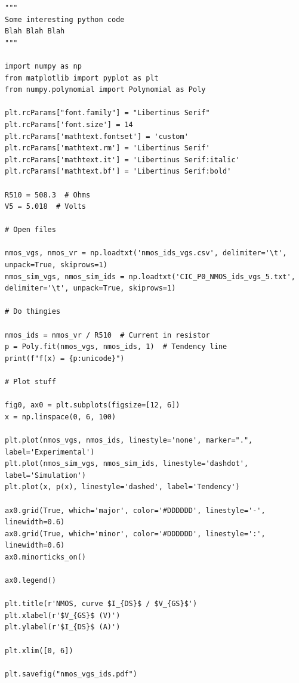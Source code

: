\begin{code}
\label{code:apx:a:python}
\begin{verbatim}
"""
Some interesting python code 
Blah Blah Blah
"""

import numpy as np
from matplotlib import pyplot as plt
from numpy.polynomial import Polynomial as Poly

plt.rcParams["font.family"] = "Libertinus Serif"
plt.rcParams['font.size'] = 14
plt.rcParams['mathtext.fontset'] = 'custom'
plt.rcParams['mathtext.rm'] = 'Libertinus Serif'
plt.rcParams['mathtext.it'] = 'Libertinus Serif:italic'
plt.rcParams['mathtext.bf'] = 'Libertinus Serif:bold'

R510 = 508.3  # Ohms
V5 = 5.018  # Volts

# Open files

nmos_vgs, nmos_vr = np.loadtxt('nmos_ids_vgs.csv', delimiter='\t', unpack=True, skiprows=1)
nmos_sim_vgs, nmos_sim_ids = np.loadtxt('CIC_P0_NMOS_ids_vgs_5.txt', delimiter='\t', unpack=True, skiprows=1)

# Do thingies

nmos_ids = nmos_vr / R510  # Current in resistor
p = Poly.fit(nmos_vgs, nmos_ids, 1)  # Tendency line
print(f"f(x) = {p:unicode}")

# Plot stuff

fig0, ax0 = plt.subplots(figsize=[12, 6])
x = np.linspace(0, 6, 100)

plt.plot(nmos_vgs, nmos_ids, linestyle='none', marker=".", label='Experimental')
plt.plot(nmos_sim_vgs, nmos_sim_ids, linestyle='dashdot', label='Simulation')
plt.plot(x, p(x), linestyle='dashed', label='Tendency')

ax0.grid(True, which='major', color='#DDDDDD', linestyle='-', linewidth=0.6)
ax0.grid(True, which='minor', color='#DDDDDD', linestyle=':', linewidth=0.6)
ax0.minorticks_on()

ax0.legend()

plt.title(r'NMOS, curve $I_{DS}$ / $V_{GS}$')
plt.xlabel(r'$V_{GS}$ (V)')
plt.ylabel(r'$I_{DS}$ (A)')

plt.xlim([0, 6])

plt.savefig("nmos_vgs_ids.pdf")
\end{verbatim}
\end{code}

